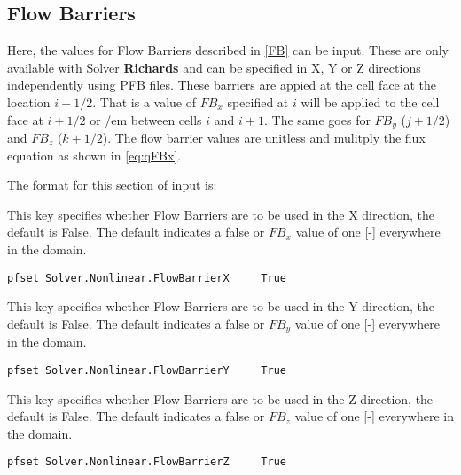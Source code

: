 \subsection{Flow Barriers}
\label{Flow Barrier Keys}

Here, the values for Flow Barriers described in \ref{FB} can be input.  These are only available with Solver {\bf Richards} and can be specified in X, Y or Z directions independently using PFB files.  These barriers are appied at the cell face at the location $i+1/2$.  That is a value of $FB_x$ specified at $i$ will be applied to the cell face at $i+1/2$ or {/em between} cells $i$ and $i+1$.  The same goes for $FB_y$ ($j+1/2$) and $FB_z$ ($k+1/2$). The flow barrier values are unitless and mulitply the flux equation as shown in \ref{eq:qFBx}.

The format for this section of input is:

{
This key specifies whether Flow Barriers are to be used in the X direction, the default is False.
The default indicates a false or $FB_x$ value of one [-] everywhere in the domain.
}
\begin{display}\begin{verbatim}
pfset Solver.Nonlinear.FlowBarrierX     True
\end{verbatim}\end{display}

{
This key specifies whether Flow Barriers are to be used in the Y direction, the default is False.
The default indicates a false or $FB_y$ value of one [-] everywhere in the domain.
}
\begin{display}\begin{verbatim}
pfset Solver.Nonlinear.FlowBarrierY     True
\end{verbatim}\end{display}

{
This key specifies whether Flow Barriers are to be used in the Z direction, the default is False.
The default indicates a false or $FB_z$ value of one [-] everywhere in the domain.
}
\begin{display}\begin{verbatim}
pfset Solver.Nonlinear.FlowBarrierZ     True
\end{verbatim}\end{display}

